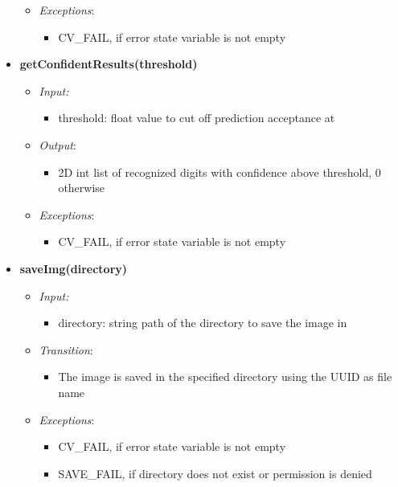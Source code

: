 \documentclass[11pt]{article}
\begin{document}
\begin{itemize}
\begin{itemize}
		    \item[] \textit{Exceptions}:
		    \begin{itemize}
		        \item CV\_FAIL, if error state variable is not empty
		    \end{itemize}
		\end{itemize}

			
		\item \textbf{getConfidentResults(threshold)}
		\begin{itemize}
		    \item[] \textit{Input: } 		    
		    \begin{itemize}
		        \item threshold: float value to cut off prediction acceptance at
		    \end{itemize}
		    \item[] \textit{Output}: 
		    \begin{itemize}
		        \item 2D int list of recognized digits with confidence above threshold, 0 otherwise 
		    \end{itemize}
		    
		    \item[] \textit{Exceptions}:
		    \begin{itemize}
		        \item CV\_FAIL, if error state variable is not empty
		    \end{itemize}
		\end{itemize}
		
		\item \textbf{saveImg(directory)}
		\begin{itemize}
		    \item[] \textit{Input: } 		    
		    \begin{itemize}
		        \item directory: string path of the directory to save the image in
		    \end{itemize}
		    \item[] \textit{Transition}: 
		    \begin{itemize}
		        \item The image is saved in the specified directory using the UUID as file name
		    \end{itemize}
		    
		    \item[] \textit{Exceptions}:
		    \begin{itemize}
		        \item CV\_FAIL, if error state variable is not empty
		        \item SAVE\_FAIL, if directory does not exist or permission is denied
		    \end{itemize}
		\end{itemize}
		

\end{itemize}
\end{document}
